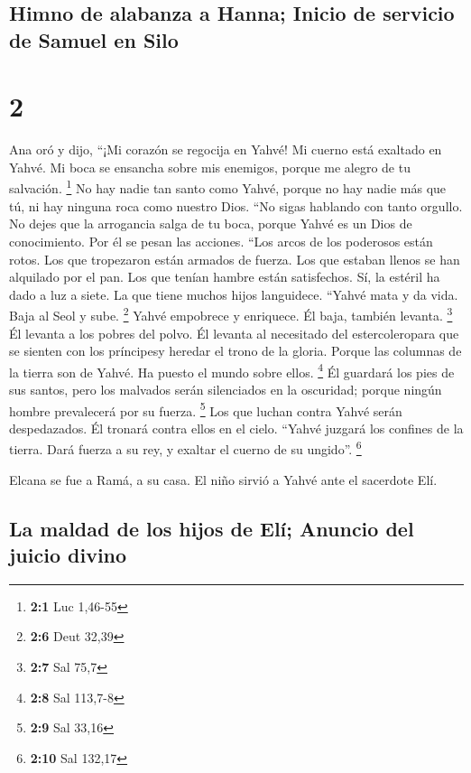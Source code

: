 \hypertarget{himno-de-alabanza-a-hanna-inicio-de-servicio-de-samuel-en-silo}{%
\subsection{Himno de alabanza a Hanna; Inicio de servicio de Samuel en
Silo}\label{himno-de-alabanza-a-hanna-inicio-de-servicio-de-samuel-en-silo}}

\hypertarget{section-1}{%
\section{2}\label{section-1}}

 Ana oró y dijo, ``¡Mi corazón se regocija en Yahvé! Mi
cuerno está exaltado en Yahvé. Mi boca se ensancha sobre mis enemigos,
porque me alegro de tu salvación. \footnote{\textbf{2:1} Luc 1,46-55}
 No hay nadie tan santo como Yahvé, porque no hay nadie
más que tú, ni hay ninguna roca como nuestro Dios.  ``No
sigas hablando con tanto orgullo. No dejes que la arrogancia salga de tu
boca, porque Yahvé es un Dios de conocimiento. Por él se pesan las
acciones.  ``Los arcos de los poderosos están rotos. Los
que tropezaron están armados de fuerza.  Los que estaban
llenos se han alquilado por el pan. Los que tenían hambre están
satisfechos. Sí, la estéril ha dado a luz a siete. La que tiene muchos
hijos languidece.  ``Yahvé mata y da vida. Baja al Seol y
sube. \footnote{\textbf{2:6} Deut 32,39}  Yahvé empobrece
y enriquece. Él baja, también levanta. \footnote{\textbf{2:7} Sal 75,7}
 Él levanta a los pobres del polvo. Él levanta al
necesitado del estercoleropara que se sienten con los príncipesy heredar
el trono de la gloria. Porque las columnas de la tierra son de Yahvé. Ha
puesto el mundo sobre ellos. \footnote{\textbf{2:8} Sal 113,7-8}
 Él guardará los pies de sus santos, pero los malvados
serán silenciados en la oscuridad; porque ningún hombre prevalecerá por
su fuerza. \footnote{\textbf{2:9} Sal 33,16}  Los que
luchan contra Yahvé serán despedazados. Él tronará contra ellos en el
cielo. ``Yahvé juzgará los confines de la tierra. Dará fuerza a su rey,
y exaltar el cuerno de su ungido''. \footnote{\textbf{2:10} Sal 132,17}

 Elcana se fue a Ramá, a su casa. El niño sirvió a Yahvé
ante el sacerdote Elí.

\hypertarget{la-maldad-de-los-hijos-de-eluxed-anuncio-del-juicio-divino}{%
\subsection{La maldad de los hijos de Elí; Anuncio del juicio
divino}\label{la-maldad-de-los-hijos-de-eluxed-anuncio-del-juicio-divino}}

